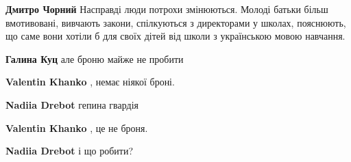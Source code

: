 \begin{itemize}
\begin{itemize}
 
\textbf{Дмитро Чорний} Насправді люди потрохи змінюються. Молоді батьки більш вмотивовані, вивчають закони, спілкуються з директорами у школах, пояснюють, що саме вони хотіли б для своїх дітей від школи з українською мовою навчання.

 
\textbf{Галина Куц} але броню майже не пробити

 
\textbf{Valentin Khanko} , немає ніякої броні.

 
\textbf{Nadiia Drebot} гепина гвардія

 
\textbf{Valentin Khanko} , це не броня.

 
\textbf{Nadiia Drebot} і що робити?

 

\end{itemize}
\end{itemize}
